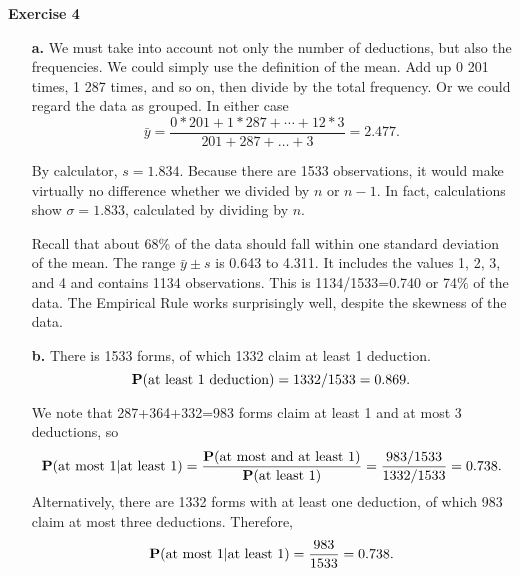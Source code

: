 \documentclass[10pt]{article}
\def\Pr{{\bf P}}
\begin{document}
{\bf Exercise 4}
\begin{itemize}
\item[\bf a.] We must take into account not only the number of deductions, but also the frequencies. We could simply use the definition of the mean. Add up 0 201 times, 1 287 times, and so on, then divide by the total frequency. Or we could regard the data as grouped. In either case
$$\bar{y}=\frac{0*201+1*287+\cdots+12*3}{201+287+\dots+3}=2.477.$$

By calculator, $s=1.834$. Because there are 1533 observations, it would make virtually no difference whether we divided by $n$ or $n-1$. In fact, calculations show $\sigma=1.833$, calculated by dividing by $n$.

Recall that about 68$\%$ of the data should fall within one standard deviation of the mean. The range $\bar{y}\pm s$ is 0.643 to 4.311. It includes the values 1, 2, 3, and 4 and contains 1134 observations. This is 1134/1533=0.740 or 74$\%$ of the data. The Empirical Rule works surprisingly well, despite the skewness of the data.
\item[\bf b.] There is 1533 forms, of which 1332 claim at least 1 deduction.
$$\Pr(\mbox{at least 1 deduction})=1332/1533=0.869.$$

We note that 287+364+332=983 forms claim at least 1 and at most 3 deductions, so
$$\Pr(\mbox{at most 1$|$at least 1})=\frac{\Pr(\mbox{at most and at least 1})}{\Pr(\mbox{at least 1})}=\frac{983/1533}{1332/1533}=0.738.$$
Alternatively, there are 1332 forms with at least one deduction, of which 983 claim at  most three deductions. Therefore,
$$\Pr(\mbox{at most 1$|$at least 1})=\frac{983}{1533}=0.738.$$
\end{itemize}
\end{document}
